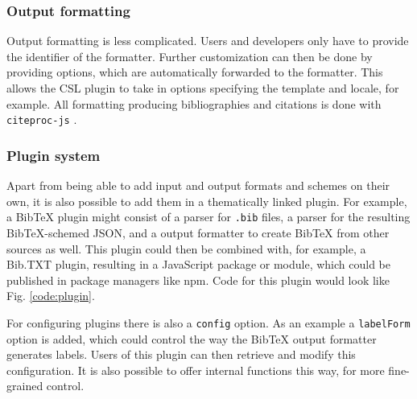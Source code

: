 \documentclass[fleqn,10pt,lineno]{wlpeerj} %
\begin{document}
\subsubsection*{Output formatting}

Output formatting is less complicated. Users and developers only have to provide the identifier of the formatter. Further customization can then be done by providing options, which are automatically forwarded to the formatter. This allows the CSL plugin to take in options specifying the template and locale, for example. All formatting producing bibliographies and citations is done with \texttt{citeproc-js} \citep{Bennett2018Juris-M/citeproc-js}.

\subsubsection*{Plugin system}

Apart from being able to add input and output formats and schemes on their own, it is also possible to add them in a thematically linked plugin. For example, a BibTeX plugin might consist of a parser for \texttt{.bib} files, a parser for the resulting BibTeX-schemed JSON, and a output formatter to create BibTeX from other sources as well. This plugin could then be combined with, for example, a Bib.TXT plugin, resulting in a JavaScript package or module, which could be published in package managers like npm. Code for this plugin would look like Fig. \ref{code:plugin}.

For configuring plugins there is also a \texttt{config} option. As an example a \texttt{labelForm} option is added, which could control the way the BibTeX output formatter generates labels. Users of this plugin can then retrieve and modify this configuration. It is also possible to offer internal functions this way, for more fine-grained control.
\end{document}
